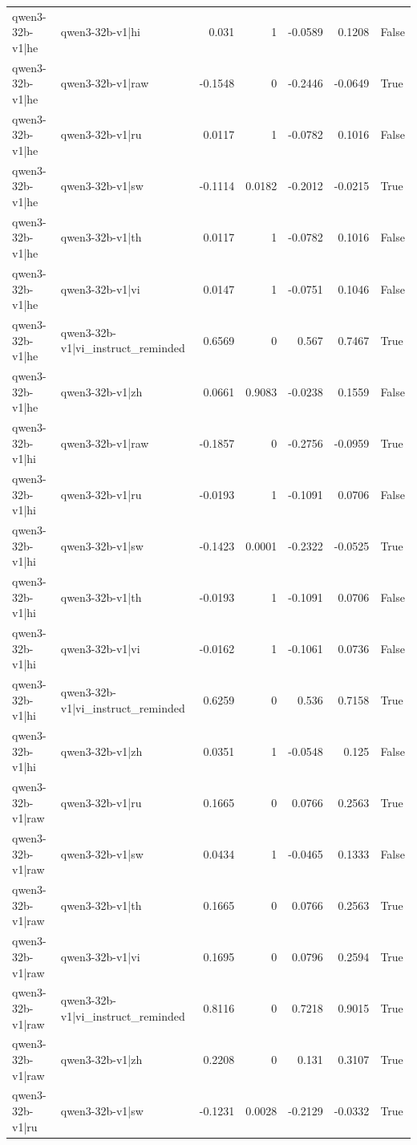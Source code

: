 \begin{table}
\begin{tabular}{l l r r r r l}
qwen3-32b-v1|he & qwen3-32b-v1|hi & 0.031 & 1 & -0.0589 & 0.1208 & False \\
qwen3-32b-v1|he & qwen3-32b-v1|raw & -0.1548 & 0 & -0.2446 & -0.0649 & True \\
qwen3-32b-v1|he & qwen3-32b-v1|ru & 0.0117 & 1 & -0.0782 & 0.1016 & False \\
qwen3-32b-v1|he & qwen3-32b-v1|sw & -0.1114 & 0.0182 & -0.2012 & -0.0215 & True \\
qwen3-32b-v1|he & qwen3-32b-v1|th & 0.0117 & 1 & -0.0782 & 0.1016 & False \\
qwen3-32b-v1|he & qwen3-32b-v1|vi & 0.0147 & 1 & -0.0751 & 0.1046 & False \\
qwen3-32b-v1|he & qwen3-32b-v1|vi_instruct_reminded & 0.6569 & 0 & 0.567 & 0.7467 & True \\
qwen3-32b-v1|he & qwen3-32b-v1|zh & 0.0661 & 0.9083 & -0.0238 & 0.1559 & False \\
qwen3-32b-v1|hi & qwen3-32b-v1|raw & -0.1857 & 0 & -0.2756 & -0.0959 & True \\
qwen3-32b-v1|hi & qwen3-32b-v1|ru & -0.0193 & 1 & -0.1091 & 0.0706 & False \\
qwen3-32b-v1|hi & qwen3-32b-v1|sw & -0.1423 & 0.0001 & -0.2322 & -0.0525 & True \\
qwen3-32b-v1|hi & qwen3-32b-v1|th & -0.0193 & 1 & -0.1091 & 0.0706 & False \\
qwen3-32b-v1|hi & qwen3-32b-v1|vi & -0.0162 & 1 & -0.1061 & 0.0736 & False \\
qwen3-32b-v1|hi & qwen3-32b-v1|vi_instruct_reminded & 0.6259 & 0 & 0.536 & 0.7158 & True \\
qwen3-32b-v1|hi & qwen3-32b-v1|zh & 0.0351 & 1 & -0.0548 & 0.125 & False \\
qwen3-32b-v1|raw & qwen3-32b-v1|ru & 0.1665 & 0 & 0.0766 & 0.2563 & True \\
qwen3-32b-v1|raw & qwen3-32b-v1|sw & 0.0434 & 1 & -0.0465 & 0.1333 & False \\
qwen3-32b-v1|raw & qwen3-32b-v1|th & 0.1665 & 0 & 0.0766 & 0.2563 & True \\
qwen3-32b-v1|raw & qwen3-32b-v1|vi & 0.1695 & 0 & 0.0796 & 0.2594 & True \\
qwen3-32b-v1|raw & qwen3-32b-v1|vi_instruct_reminded & 0.8116 & 0 & 0.7218 & 0.9015 & True \\
qwen3-32b-v1|raw & qwen3-32b-v1|zh & 0.2208 & 0 & 0.131 & 0.3107 & True \\
qwen3-32b-v1|ru & qwen3-32b-v1|sw & -0.1231 & 0.0028 & -0.2129 & -0.0332 & True \\

\end{tabular}
\end{table}
